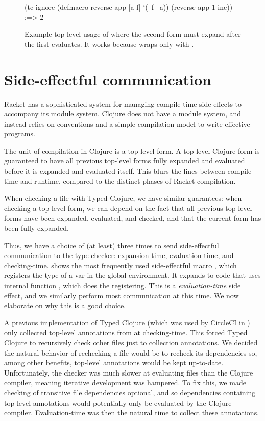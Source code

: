 \begin{figure}
\begin{cljlisting}
(tc-ignore
  (defmacro reverse-app [a f] `(~f ~a))
  (reverse-app 1 inc)) ;=> 2
\end{cljlisting}
  \caption{Example top-level usage of 
           where the second form must expand after the first evaluates.
  It works because  wraps only with .}
  \label{fig:analyzer:tc-ignore-usage}
\end{figure}

\section{Side-effectful communication}

Racket has a sophisticated system for managing compile-time side effects
to accompany its module system.
Clojure does not have a module system, and instead relies on conventions
and a simple compilation model to write effective programs.

The unit of compilation in Clojure is a top-level form. A top-level Clojure form
is guaranteed to have all previous top-level forms fully expanded
and evaluated before it is expanded and evaluated itself.
This blurs the lines between compile-time and runtime, compared to the
distinct phases of Racket compilation.

When checking a file with Typed Clojure, we have similar guarantees:
when checking a top-level form, we can depend on the fact that all
previous top-level forms have been expanded, evaluated, and checked,
and that the current form has been fully expanded.

Thus, we have a choice of (at least) three times to send side-effectful communication
to the type checker:
expansion-time, evaluation-time, and checking-time.
 shows the most frequently used
side-effectful macro , which registers the type of a var in the
global environment.
It expands to code that uses internal function , which does
the registering. This is a \emph{evaluation-time} side effect,
and we similarly perform most communication at this time.
We now elaborate on why this is a good choice.

A previous implementation of Typed Clojure (which was used by CircleCI
in ) only collected top-level annotations
from  at checking-time. This forced Typed Clojure to recursively
check other files just to collection annotations.
We decided the natural behavior of rechecking a file would be to
recheck its dependencies so, among other benefits, top-level annotations
would be kept up-to-date.
Unfortunately, the checker was much slower at evaluating files
than the Clojure compiler, meaning iterative development was hampered.
To fix this, we made checking of transitive file dependencies optional, and
so dependencies containing top-level annotations would potentially only 
be evaluated by the Clojure compiler.
Evaluation-time was then the natural time to collect these annotations.

